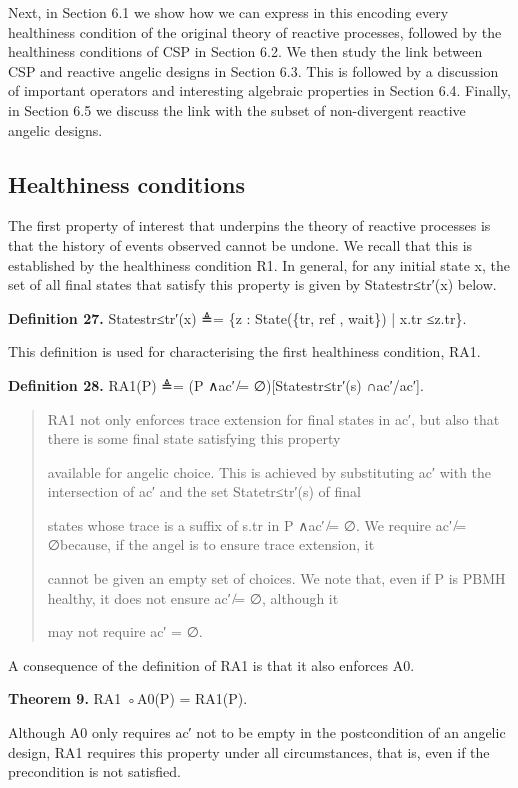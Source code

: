 \documentclass[11pt]{article}
\begin{document}
Next, in Section 6.1 we show how we can express in this encoding every healthiness condition of the original theory of reactive processes, followed by the healthiness conditions of CSP in Section 6.2. We then study the link between CSP and reactive angelic designs in Section 6.3. This is followed by a discussion of important operators and interesting algebraic properties in Section 6.4. Finally, in Section 6.5 we discuss the link with the subset of non-divergent reactive angelic designs.

\subsection{Healthiness conditions}
The first property of interest that underpins the theory of reactive processes is that the history of events observed cannot be undone. We recall that this is established by the healthiness condition R1. In general, for any initial state x, the set of all final states that satisfy this property is given by Statestr≤tr′(x) below.

\noindent\textbf{Definition 27.} Statestr≤tr′(x) ≜= \{z : State(\{tr, ref , wait\}) | x.tr ≤z.tr\}.


This definition is used for characterising the first healthiness condition, RA1.

\noindent\textbf{Definition 28.} RA1(P) ≜= (P ∧ac′ ̸= ∅)[Statestr≤tr′(s) ∩ac′/ac′].


\begin{quote}\small\raggedright
RA1 not only enforces trace extension for final states in ac′, but also that there is some final state satisfying this property
\par
available for angelic choice. This is achieved by substituting ac′ with the intersection of ac′ and the set Statetr≤tr′(s) of final
\par
states whose trace is a suffix of s.tr in P ∧ac′ ̸= ∅. We require ac′ ̸= ∅because, if the angel is to ensure trace extension, it
\par
cannot be given an empty set of choices. We note that, even if P is PBMH healthy, it does not ensure ac′ ̸= ∅, although it
\par
may not require ac′ = ∅.
\end{quote}

A consequence of the definition of RA1 is that it also enforces A0.

\noindent\textbf{Theorem 9.} RA1 ◦A0(P) = RA1(P).


Although A0 only requires ac′ not to be empty in the postcondition of an angelic design, RA1 requires this property under all circumstances, that is, even if the precondition is not satisfied.
\end{document}
